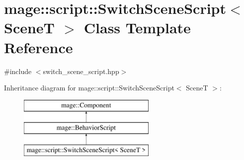 \hypertarget{classmage_1_1script_1_1_switch_scene_script}{}\section{mage\+:\+:script\+:\+:Switch\+Scene\+Script$<$ SceneT $>$ Class Template Reference}
\label{classmage_1_1script_1_1_switch_scene_script}


{\ttfamily \#include $<$switch\+\_\+scene\+\_\+script.\+hpp$>$}

Inheritance diagram for mage\+:\+:script\+:\+:Switch\+Scene\+Script$<$ SceneT $>$\+:\begin{figure}[H]
\begin{center}
\leavevmode
\includegraphics[height=3.000000cm]{classmage_1_1script_1_1_switch_scene_script}
\end{center}
\end{figure}

